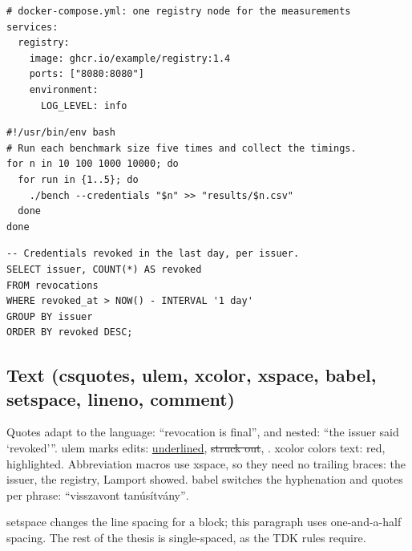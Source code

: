 \begin{listing}[!ht]
\begin{verbatim}
# docker-compose.yml: one registry node for the measurements
services:
  registry:
    image: ghcr.io/example/registry:1.4
    ports: ["8080:8080"]
    environment:
      LOG_LEVEL: info
\end{verbatim}
\caption{YAML.}\label{lst:latex:yaml}
\end{listing}

\begin{listing}[!ht]
\begin{verbatim}
#!/usr/bin/env bash
# Run each benchmark size five times and collect the timings.
for n in 10 100 1000 10000; do
  for run in {1..5}; do
    ./bench --credentials "$n" >> "results/$n.csv"
  done
done
\end{verbatim}
\caption{Bash.}\label{lst:latex:bash}
\end{listing}

\begin{listing}[!ht]
\begin{verbatim}
-- Credentials revoked in the last day, per issuer.
SELECT issuer, COUNT(*) AS revoked
FROM revocations
WHERE revoked_at > NOW() - INTERVAL '1 day'
GROUP BY issuer
ORDER BY revoked DESC;
\end{verbatim}
\caption{SQL.}\label{lst:latex:sql}
\end{listing}
\FloatBarrier

\subsection{Text (csquotes, ulem, xcolor, xspace, babel, setspace, lineno, comment)}\label{app:latex:text}
Quotes adapt to the language: \enquote{revocation is final}, and nested: \enquote{the issuer said \enquote{revoked}}.
ulem marks edits: \uline{underlined}, \sout{struck out}, . xcolor colors text: \textcolor{red!70!black}{red}, \colorbox{yellow!40}{highlighted}.
Abbreviation macros use xspace, so they need no trailing braces: \eg the issuer, \ie the registry, Lamport \etal showed.
babel switches the hyphenation and quotes per phrase: \foreignlanguage{magyar}{\enquote{visszavont tanúsítvány}}.

\begin{onehalfspace}
setspace changes the line spacing for a block; this paragraph uses one-and-a-half spacing.
The rest of the thesis is single-spaced, as the TDK rules require.
\end{onehalfspace}

